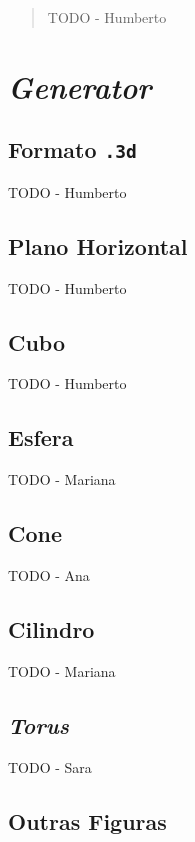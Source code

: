 \documentclass[12pt, a4paper]{article}
\begin{document}
\pagebreak

\begin{abstract}
    \noindent
    {\color{red} TODO - Humberto}
\end{abstract}

\section{\emph{Generator}}

\subsection{Formato \texttt{.3d}}

{\color{red} TODO - Humberto}

\subsection{Plano Horizontal}

{\color{red} TODO - Humberto}

\subsection{Cubo}

{\color{red} TODO - Humberto}

\subsection{Esfera}

{\color{red} TODO - Mariana}

\subsection{Cone}

{\color{red} TODO - Ana}

\subsection{Cilindro}

{\color{red} TODO - Mariana}

\subsection{\emph{Torus}}

{\color{red} TODO - Sara}

\subsection{Outras Figuras}
\end{document}
